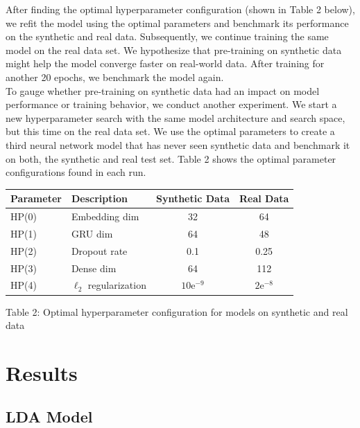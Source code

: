 \documentclass[11pt]{article}
\begin{document}
\noindent After finding the optimal hyperparameter configuration (shown in Table 2 below), we refit the model using the optimal parameters and benchmark its performance on the synthetic and real data. Subsequently, we continue training the same model on the real data set. We hypothesize that pre-training on synthetic data might help the model converge faster on real-world data. After training for another 20 epochs, we benchmark the model again.
\\[5pt]
\noindent To gauge whether pre-training on synthetic data had an impact on model performance or training behavior, we conduct another experiment. We start a new hyperparameter search with the same model architecture and search space, but this time on the real data set. We use the optimal parameters to create a third neural network model that has never seen synthetic data and benchmark it on both, the synthetic and real test set. Table 2 shows the optimal parameter configurations found in each run.


\begin{center}
\begin{tabular}{llcc}
\toprule
    Parameter & Description & Synthetic Data & Real Data \\
\midrule
    HP(0) & Embedding dim & 32 & 64\\
    HP(1) & GRU dim & 64 & 48\\
    HP(2) & Dropout rate & 0.1 & 0.25\\
    HP(3) & Dense dim & 64 & 112\\
    HP(4) & $\ell_2$ regularization & $10\mathrm{e}^{-9}$ & $2\mathrm{e}^{-8}$\\
\bottomrule
\end{tabular}
\end{center}
\begin{center}
	Table 2: Optimal hyperparameter configuration for models on synthetic and real data
\end{center}


\section{Results}
\subsection{LDA Model}
\end{document}
